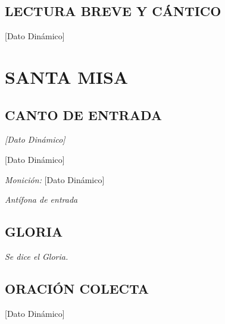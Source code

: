 \documentclass[11pt, letterpaper, twoside]{article}
\newcommand{\rubrica}[1]{\textcolor{rubricred}{\small\textit{#1}}}
\DeclareRobustCommand{\VAR}[1]{[Dato Dinámico]}
\DeclareRobustCommand{\BLOCK}[1]{}
\begin{document}
\begin{multicols}{2}
\BLOCK{ if laudes.evangelio }
\subsection*{LECTURA BREVE Y CÁNTICO}
\VAR{laudes.evangelio.texto | escape_tex | lettrine}
\par\vspace{0.3cm}
\BLOCK{ endif }
\BLOCK{ endif }

\BLOCK{ if misa }
\section*{SANTA MISA}

\BLOCK{ if misa.canto_entrada }
\subsection*{CANTO DE ENTRADA}
\noindent\rubrica{\VAR{misa.canto_entrada.titulo | escape_tex}} \par\vspace{0.1cm}
\VAR{misa.canto_entrada.letra | format_canto}
\par\vspace{0.3cm}
\BLOCK{ endif }


\BLOCK{ if misa.monicion_entrada }
\noindent\rubrica{Monición:} \VAR{misa.monicion_entrada | escape_tex} \par\vspace{0.3cm}
\BLOCK{ endif }

\BLOCK{ if misa.antifona_entrada }
\noindent\rubrica{Antífona de entrada} \par
\VAR{misa.antifona_entrada | escape_tex | lettrine}
\BLOCK{ endif }

\BLOCK{ if misa.gloria }
\subsection*{GLORIA}
\noindent\rubrica{Se dice el Gloria.} \par\vspace{0.3cm}
\BLOCK{ endif }

\BLOCK{ if misa.oracion_colecta }
\subsection*{ORACIÓN COLECTA}
\VAR{misa.oracion_colecta | escape_tex | lettrine}
\BLOCK{ endif }


\end{multicols}
\end{document}
